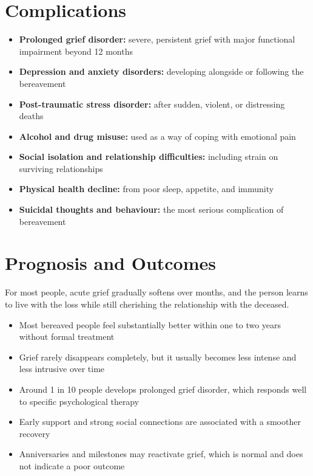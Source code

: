 \section*{Complications}
\begin{itemize}
    \item \textbf{Prolonged grief disorder:} severe, persistent grief with major functional impairment beyond 12 months
    \item \textbf{Depression and anxiety disorders:} developing alongside or following the bereavement
    \item \textbf{Post-traumatic stress disorder:} after sudden, violent, or distressing deaths
    \item \textbf{Alcohol and drug misuse:} used as a way of coping with emotional pain
    \item \textbf{Social isolation and relationship difficulties:} including strain on surviving relationships
    \item \textbf{Physical health decline:} from poor sleep, appetite, and immunity
    \item \textbf{Suicidal thoughts and behaviour:} the most serious complication of bereavement
\end{itemize}

\section*{Prognosis and Outcomes}
For most people, acute grief gradually softens over months, and the person learns to live with the loss while still cherishing the relationship with the deceased.

\begin{itemize}
    \item Most bereaved people feel substantially better within one to two years without formal treatment
    \item Grief rarely disappears completely, but it usually becomes less intense and less intrusive over time
    \item Around 1 in 10 people develops prolonged grief disorder, which responds well to specific psychological therapy
    \item Early support and strong social connections are associated with a smoother recovery
    \item Anniversaries and milestones may reactivate grief, which is normal and does not indicate a poor outcome
\end{itemize}

